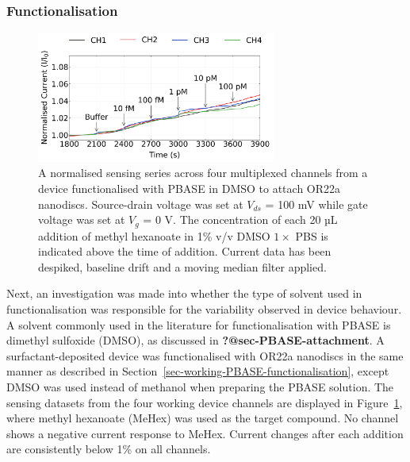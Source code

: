 \documentclass[
  a4paper,
]{scrbook}
\begin{document}
\hypertarget{functionalisation}{%
\subsubsection*{Functionalisation}\label{functionalisation}}

\begin{figure}

{\centering \includegraphics[width=0.7\textwidth,height=\textheight]{figures/ch7/NTQ25C10_OR22a_sample_220208_filtered_detrend_trunc_arrows_normalised.png}

}

\caption{\label{fig-DMSO-sensing}A normalised sensing series across four
multiplexed channels from a device functionalised with PBASE in DMSO to
attach OR22a nanodiscs. Source-drain voltage was set at \(V_{ds}\) = 100
mV while gate voltage was set at \(V_g\) = 0 V. The concentration of
each 20 µL addition of methyl hexanoate in 1\% v/v DMSO \(1 \times\) PBS
is indicated above the time of addition. Current data has been despiked,
baseline drift and a moving median filter applied.}

\end{figure}

Next, an investigation was made into whether the type of solvent used in
functionalisation was responsible for the variability observed in device
behaviour. A solvent commonly used in the literature for
functionalisation with PBASE is dimethyl sulfoxide (DMSO), as discussed
in \textbf{?@sec-PBASE-attachment}. A surfactant-deposited device was
functionalised with OR22a nanodiscs in the same manner as described in
Section~\ref{sec-working-PBASE-functionalisation}, except DMSO was used
instead of methanol when preparing the PBASE solution. The sensing
datasets from the four working device channels are displayed in
Figure~\ref{fig-DMSO-sensing}, where methyl hexanoate (MeHex) was used
as the target compound. No channel shows a negative current response to
MeHex. Current changes after each addition are consistently below 1\% on
all channels.
\end{document}
